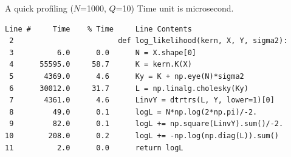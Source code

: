 \documentclass[14pt,aspectratio=1610]{beamer}
\newcommand{\yV}{\mathbf{y}}
\newcommand{\xM}{\mathbf{X}}
\newcommand{\K}{\mathbf{K}}
\renewcommand{\L}{\mathbf{L}}
\newcommand{\I}{\mathbf{I}}
\begin{document}

\begin{frame}[fragile]{A quick profiling ($N$=1000, $Q$=10)}
Time unit is microsecond.
\small
\begin{verbatim}
Line #     Time    % Time     Line Contents
 2                        def log_likelihood(kern, X, Y, sigma2):
 3          6.0      0.0      N = X.shape[0]
 4      55595.0     58.7      K = kern.K(X)
 5       4369.0      4.6      Ky = K + np.eye(N)*sigma2
 6      30012.0     31.7      L = np.linalg.cholesky(Ky)
 7       4361.0      4.6      LinvY = dtrtrs(L, Y, lower=1)[0]
 8         49.0      0.1      logL = N*np.log(2*np.pi)/-2.
 9         82.0      0.1      logL += np.square(LinvY).sum()/-2.
10        208.0      0.2      logL += -np.log(np.diag(L)).sum()
11          2.0      0.0      return logL
\end{verbatim}
\end{frame}
\end{document}
